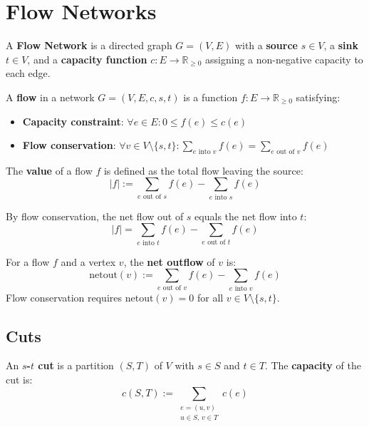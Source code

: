 \section{Flow Networks}

\begin{definition}
	A \textbf{Flow Network} is a directed graph $G = (V, E)$ with a \textbf{source} $s \in V$, a \textbf{sink} $t \in V$, and a \textbf{capacity function} $c : E \to \mathbb{R}_{\geq 0}$ assigning a non-negative capacity to each edge.
\end{definition}

\begin{definition}
	A \textbf{flow} in a network $G = (V, E, c, s, t)$ is a function $f : E \to \mathbb{R}_{\geq 0}$ satisfying:
	\begin{itemize}
		\item \textbf{Capacity constraint}: $\forall e \in E : 0 \leq f(e) \leq c(e)$
		\item \textbf{Flow conservation}: $\forall v \in V \setminus \{s, t\} : \sum_{e \text{ into } v} f(e) = \sum_{e \text{ out of } v} f(e)$
	\end{itemize}
\end{definition}

\begin{definition}
	The \textbf{value} of a flow $f$ is defined as the total flow leaving the source:
	$$|f| := \sum_{e \text{ out of } s} f(e) - \sum_{e \text{ into } s} f(e)$$
\end{definition}

\begin{remark}
	By flow conservation, the net flow out of $s$ equals the net flow into $t$:
	$$|f| = \sum_{e \text{ into } t} f(e) - \sum_{e \text{ out of } t} f(e)$$
\end{remark}

\begin{definition}
	For a flow $f$ and a vertex $v$, the \textbf{net outflow} of $v$ is:
	$$\text{netout}(v) := \sum_{e \text{ out of } v} f(e) - \sum_{e \text{ into } v} f(e)$$
	Flow conservation requires $\text{netout}(v) = 0$ for all $v \in V \setminus \{s, t\}$.
\end{definition}

\subsection{Cuts}

\begin{definition}
	An \textbf{$s$-$t$ cut} is a partition $(S, T)$ of $V$ with $s \in S$ and $t \in T$. The \textbf{capacity} of the cut is:
	$$c(S, T) := \sum_{\substack{e = (u,v) \\ u \in S,\, v \in T}} c(e)$$
\end{definition}

